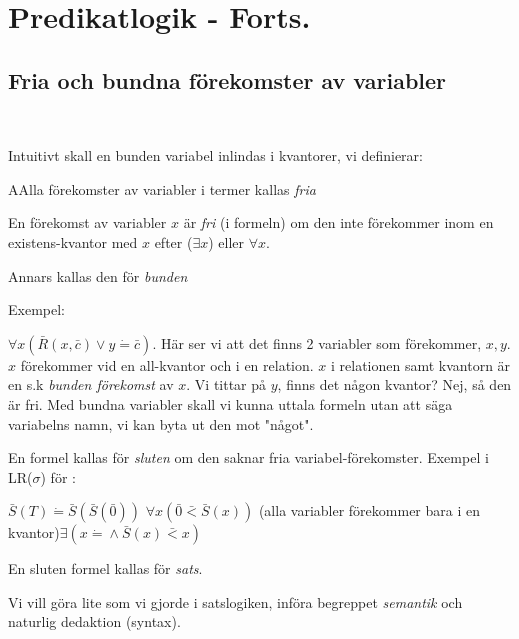 \section{Predikatlogik - Forts.}
\par\bigskip
\subsection{Fria och bundna förekomster av variabler}\hfill\\
\par\bigskip
\noindent Intuitivt skall en bunden variabel inlindas i kvantorer, vi definierar:
\par\bigskip
\begin{theo}
  AAlla förekomster av variabler i termer kallas \textit{fria}
  \par\bigskip
  \noindent En förekomst av variabler $x$ är \textit{fri} (i formeln) om den inte förekommer inom en existens-kvantor med $x$ efter ($\exists x$) eller $\forall x$.\par
  \noindent Annars kallas den för \textit{bunden}
\end{theo}
\par\bigskip
\noindent Exempel:\par
\noindent $\forall x\left(\bar{R}(x,\bar{c})\vee y\dot{=}\bar{c}\right)$. Här ser vi att det finns 2 variabler som  förekommer, $x,y$. $x$ förekommer vid en all-kvantor och i en relation. $x$ i relationen samt kvantorn är en s.k \textit{bunden förekomst} av $x$. Vi tittar på $y$, finns det någon kvantor? Nej, så den är fri. Med bundna variabler skall vi kunna uttala formeln utan att säga variabelns namn, vi kan byta ut den mot "något".
\par\bigskip
\noindent En formel kallas för \textit{sluten} om den saknar fria variabel-förekomster. Exempel i LR($\sigma$) för :
\par\bigskip $\bar{S}(T)\dot{=}\bar{S}(\bar{S}(\bar{0}))$ \qquad $\forall x\left(\bar{0}\bar{<}\bar{S}(x)\right)$ (alla variabler förekommer bara i en kvantor)\qquad$\exists\left(x\dot{=}\wedge\bar{S}(x)\bar{<}x\right)$
\par\bigskip
\noindent En sluten formel kallas för \textit{sats}.
\par\bigskip
\noindent Vi vill göra lite som vi gjorde i satslogiken, införa begreppet \textit{semantik} och naturlig dedaktion (syntax).
\par\bigskip
